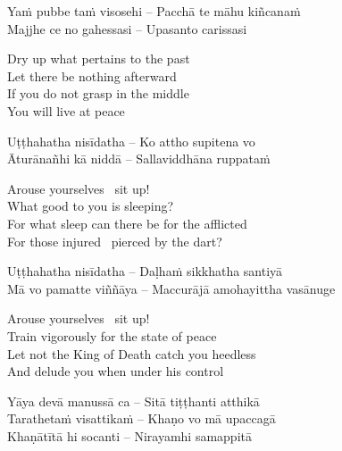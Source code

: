 \suttaRef{[Dhp 91]}

\begin{twochants}
  Yaṁ pubbe taṁ visosehi – Pacchā te māhu kiñcanaṁ\\
  Majjhe ce no gahessasi – Upasanto carissasi\\
\end{twochants}

\begin{english-verses}
  Dry up what pertains to the past\\
  Let there be nothing afterward\\
  If you do not grasp in the middle\\
  You will live at peace
\end{english-verses}

\suttaRef{[Snp 949]}

\begin{twochants}
  Uṭṭhahatha nisīdatha – Ko attho supitena vo\\
  Āturānañhi kā niddā – Sallaviddhāna ruppataṁ\\
\end{twochants}

\begin{english-verses}
  Arouse yourselves \breathmark\ sit up!\\
  What good to you is sleeping?\\
  For what sleep can there be for the afflicted\\
  For those injured \breathmark\ pierced by the dart?
\end{english-verses}

\begin{twochants}
  Uṭṭhahatha nisīdatha – Daḷhaṁ sikkhatha santiyā\\
  Mā vo pamatte viññāya – Maccurājā amohayittha vasānuge\\
\end{twochants}

\begin{english-verses}
  Arouse yourselves \breathmark\ sit up!\\
  Train vigorously for the state of peace\\
  Let not the King of Death catch you heedless\\
  And delude you when under his control
\end{english-verses}

\begin{twochants}
  Yāya devā manussā ca – Sitā tiṭṭhanti atthikā\\
  Tarathetaṁ visattikaṁ – Khaṇo vo mā upaccagā\\
  Khaṇātītā hi socanti – Nirayamhi samappitā\\
\end{twochants}

